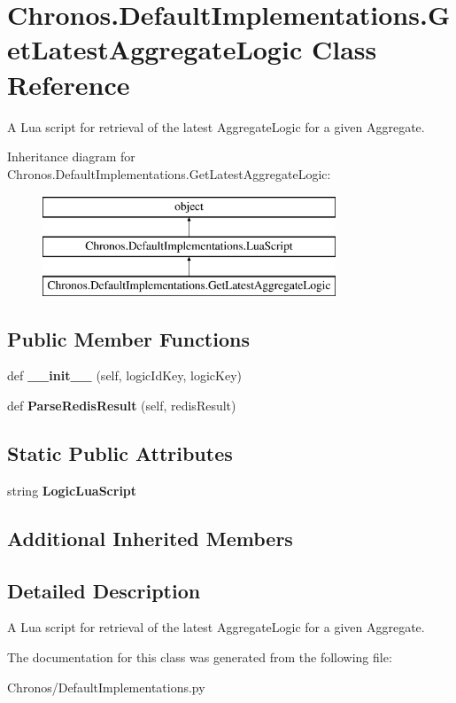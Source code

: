 \hypertarget{classChronos_1_1DefaultImplementations_1_1GetLatestAggregateLogic}{}\section{Chronos.\+Default\+Implementations.\+Get\+Latest\+Aggregate\+Logic Class Reference}
\label{classChronos_1_1DefaultImplementations_1_1GetLatestAggregateLogic}


A Lua script for retrieval of the latest Aggregate\+Logic for a given Aggregate.  


Inheritance diagram for Chronos.\+Default\+Implementations.\+Get\+Latest\+Aggregate\+Logic\+:\begin{figure}[H]
\begin{center}
\leavevmode
\includegraphics[height=3.000000cm]{classChronos_1_1DefaultImplementations_1_1GetLatestAggregateLogic}
\end{center}
\end{figure}
\subsection*{Public Member Functions}
\begin{DoxyCompactItemize}
\item 
def {\bfseries \+\_\+\+\_\+init\+\_\+\+\_\+} (self, logic\+Id\+Key, logic\+Key)
\item 
def {\bfseries Parse\+Redis\+Result} (self, redis\+Result)
\end{DoxyCompactItemize}
\subsection*{Static Public Attributes}
\begin{DoxyCompactItemize}
\item 
string {\bfseries Logic\+Lua\+Script}
\end{DoxyCompactItemize}
\subsection*{Additional Inherited Members}


\subsection{Detailed Description}
A Lua script for retrieval of the latest Aggregate\+Logic for a given Aggregate. 

The documentation for this class was generated from the following file\+:\begin{DoxyCompactItemize}
\item 
Chronos/Default\+Implementations.\+py\end{DoxyCompactItemize}

